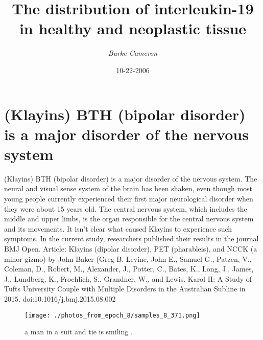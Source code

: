 \documentclass{article}%
\title{The distribution of interleukin{-}19 in healthy and neoplastic tissue}%
\author{\textit{Burke Cameron}}%
\date{10-22-2006}%
\begin{document}
%
\normalsize%
\maketitle%
\section{(Klayins) BTH (bipolar disorder) is a major disorder of the nervous system}%
\label{sec:(Klayins)BTH(bipolardisorder)isamajordisorderofthenervoussystem}%
(Klayins) BTH (bipolar disorder) is a major disorder of the nervous system. The neural and visual sense system of the brain has been shaken, even though most young people currently experienced their first major neurological disorder when they were about 15 years old. The central nervous system, which includes the middle and upper limbs, is the organ responsible for the central nervous system and its movements. It isn’t clear what caused Klayins to experience such symptoms.\newline%
In the current study, researchers published their results in the journal BMJ Open.\newline%
Article: Klayins (dipolar disorder), PET (pharableis), and NCCK (a minor gizmo)\newline%
by John Baker\newline%
(Greg B. Levine, John E., Samuel G., Patzen, V., Coleman, D., Robert, M., Alexander, J., Potter, C., Bates, K., Long, J., James, J., Lundberg, K., Froehlich, S., Grandner, W., and Lewis. Karol II: A Study of Tufts University Couple with Multiple Disorders in the Australian Subline in 2015.\newline%
doi:10.1016/j.bmj.2015.08.002\newline%

%


\begin{figure}[h!]%
\centering%
\texttt{[image: ./photos\_from\_epoch\_8/samples\_8\_371.png]}%
\caption{a man in a suit and tie is smiling .}%
\end{figure}

%
\end{document}
